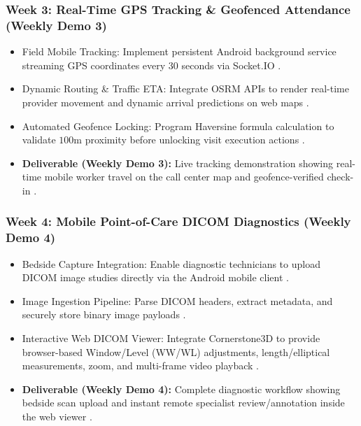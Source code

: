 \documentclass[lettersize,onecolumn,journal]{IEEEtran}
\begin{document}
	\subsubsection{Week 3: Real-Time GPS Tracking \& Geofenced Attendance (Weekly Demo 3)}
	\begin{itemize}
		\item Field Mobile Tracking: Implement persistent Android background service streaming GPS coordinates every 30 seconds via Socket.IO \cite{zandbergen2009accuracy, fette2011websocket}.
		\item Dynamic Routing \& Traffic ETA: Integrate OSRM APIs to render real-time provider movement and dynamic arrival predictions on web maps \cite{osrm_routing}.
		\item Automated Geofence Locking: Program Haversine formula calculation to validate $100\text{m}$ proximity before unlocking visit execution actions \cite{haversine_formula}.
		\item \textbf{Deliverable (Weekly Demo 3):} Live tracking demonstration showing real-time mobile worker travel on the call center map and geofence-verified check-in \cite{zandbergen2009accuracy, haversine_formula}.
	\end{itemize}
	
	\subsubsection{Week 4: Mobile Point-of-Care DICOM Diagnostics (Weekly Demo 4)}
	\begin{itemize}
		\item Bedside Capture Integration: Enable diagnostic technicians to upload DICOM image studies directly via the Android mobile client \cite{dicom2021, pacs2001}.
		\item Image Ingestion Pipeline: Parse DICOM headers, extract metadata, and securely store binary image payloads \cite{dicom2021}.
		\item Interactive Web DICOM Viewer: Integrate Cornerstone3D to provide browser-based Window/Level (WW/WL) adjustments, length/elliptical measurements, zoom, and multi-frame video playback \cite{cornerstone3d}.
		\item \textbf{Deliverable (Weekly Demo 4):} Complete diagnostic workflow showing bedside scan upload and instant remote specialist review/annotation inside the web viewer \cite{dicom2021, cornerstone3d}.
	\end{itemize}
	
\end{document}
